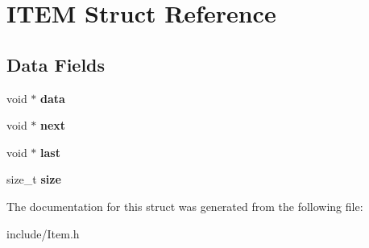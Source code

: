 \hypertarget{struct_i_t_e_m}{\section{I\-T\-E\-M Struct Reference}
\label{struct_i_t_e_m}
}
\subsection*{Data Fields}
\begin{DoxyCompactItemize}
\item 
\hypertarget{struct_i_t_e_m_a735984d41155bc1032e09bece8f8d66d}{void $\ast$ {\bfseries data}}\label{struct_i_t_e_m_a735984d41155bc1032e09bece8f8d66d}

\item 
\hypertarget{struct_i_t_e_m_ae870f212f5e04923cf5cde80f37def93}{void $\ast$ {\bfseries next}}\label{struct_i_t_e_m_ae870f212f5e04923cf5cde80f37def93}

\item 
\hypertarget{struct_i_t_e_m_aeb2a0ce4602c86a277ac94d98da0dc0b}{void $\ast$ {\bfseries last}}\label{struct_i_t_e_m_aeb2a0ce4602c86a277ac94d98da0dc0b}

\item 
\hypertarget{struct_i_t_e_m_a854352f53b148adc24983a58a1866d66}{size\-\_\-t {\bfseries size}}\label{struct_i_t_e_m_a854352f53b148adc24983a58a1866d66}

\end{DoxyCompactItemize}


The documentation for this struct was generated from the following file\-:\begin{DoxyCompactItemize}
\item 
include/Item.\-h\end{DoxyCompactItemize}
